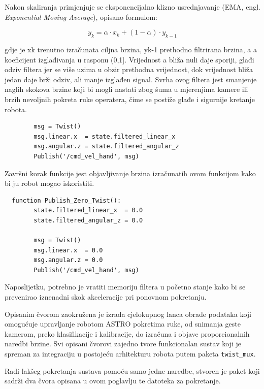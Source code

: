 \documentclass[12pt,a4paper,oneside]{report}
\begin{document}
Nakon skaliranja primjenjuje se eksponencijalno klizno usrednjavanje 
(EMA, engl. \textit{Exponential Moving Average}), opisano formulom:

\begin{equation}
y_k = \alpha \cdot x_k + (1 - \alpha) \cdot y_{k-1}
\end{equation}

gdje je xk trenutno izračunata ciljna brzina, yk-1 prethodno filtrirana brzina, a a koeficijent 
izglađivanja u rasponu (0,1]. Vrijednost a bliža nuli daje sporiji, glađi odziv filtera jer se više uzima 
u obzir prethodna vrijednost, dok vrijednost bliža jedan daje brži odziv, ali manje izglađen signal. Svrha 
ovog filtera jest smanjenje naglih skokova brzine koji bi mogli nastati zbog šuma u mjerenjima kamere ili 
brzih nevoljnih pokreta ruke operatera, čime se postiže glađe i sigurnije kretanje robota.

\begin{verbatim}
        msg = Twist()
        msg.linear.x  = state.filtered_linear_x
        msg.angular.z = state.filtered_angular_z
        Publish('/cmd_vel_hand', msg)
\end{verbatim}

Završni korak funkcije jest objavljivanje brzina izračunatih ovom funkcijom kako bi ju robot mogao iskoristiti.

\begin{verbatim}
  function Publish_Zero_Twist():
        state.filtered_linear_x  = 0.0
        state.filtered_angular_z = 0.0

        msg = Twist()
        msg.linear.x  = 0.0
        msg.angular.z = 0.0
        Publish('/cmd_vel_hand', msg)
\end{verbatim}

Naposlijetku, potrebno je vratiti memoriju filtera u početno stanje kako bi se prevenirao iznenadni skok 
akceleracije pri ponovnom pokretanju. 

Opisanim čvorom zaokružena je izrada cjelokupnog lanca obrade podataka koji omogućuje upravljanje 
robotom ASTRO pokretima ruke, od snimanja geste kamerom, preko klasifikacije i kalibracije, do izračuna i 
objave proporcionalnih naredbi brzine. Svi opisani čvorovi zajedno tvore funkcionalan sustav koji je 
spreman za integraciju u postojeću arhitekturu robota putem paketa \texttt{twist\_mux}. 

Radi lakšeg pokretanja sustava pomoću samo jedne naredbe, stvoren je paket koji sadrži dva čvora opisana u 
ovom poglavlju te datoteka za pokretanje.
\end{document}

